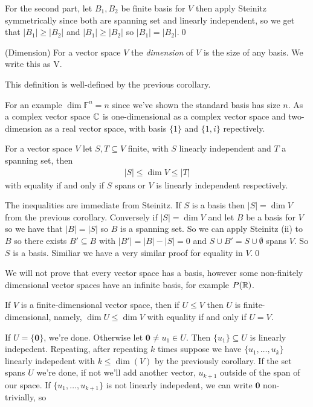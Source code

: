 \documentclass{article}
\newcommand{\F}{\mathbb{F}}
\begin{document}
For the second part, let $ B_1,B_2 $ be finite basis for $ V $ then apply Steinitz symmetrically since both are spanning set and linearly independent, so we get that $ |B_1|\ge |B_2| $ and $ |B_1|\ge |B_2| $ so $ |B_1|=|B_2| $.\qed
\begin{definition}
	(Dimension) For a vector space $ V $ the \textit{dimension} of $ V $ is the size of any basis. We write this as \dim V.
\end{definition}
This definition is well-defined by the previous corollary.\par
For an example $ \dim \F^n=n $ since we've shown the standard basis has size $ n $. As a complex vector space $ \mathbb{C} $ is one-dimensional as a complex vector space and two-dimension as a real vector space, with basis $ \{1\} $ and $ \{1,i\} $ repectively.
\begin{corollary}
  For a vector space $ V $ let $ S,T\subseteq V $ finite, with $ S $ linearly independent and $ T $ a spanning set, then
  \begin{align*}
	  |S|\le \dim V\le |T|
	  \end{align*}
	  with equality if and only if $ S $ spans or $ V $ is linearly independent respectively.
\end{corollary}
\pf The inequalities are immediate from Steinitz. If $ S $ is a basis then $ |S|=\dim V $ from the previous corollary. Conversely if $ |S|=\dim V $ and let $ B $ be a basis for $ V $ so we have that $ |B|=|S| $ so $ B $ is a spanning set. So we can apply Steinitz (ii) to $ B $ so there exists $ B'\subseteq B $ with $ |B'|=|B|-|S|=0 $ and $ S\cup B'=S\cup \emptyset $ spans $ V $. So $ S $ is a basis. Similiar we have a very similar proof for equality in $ V $.\qed\par We will not prove that every vector space has a basis, however some non-finitely dimensional vector spaces have an infinite basis, for example $ P(\mathbb{R}) $.
\begin{proposition}
  If $ V $ is a finite-dimensional vector space, then if $ U\le V $ then $ U $ is finite-dimensional, namely, $ \dim U \le \dim V $ with equality if and only if $ U=V $.
\end{proposition}
\pf If $ U=\{\mathbf 0\} $, we're done. Otherwise let $ \mathbf 0\ne u_1\in U $. Then $ \{u_1\}\subseteq U $ is linearly indepedent. Repeating, after repeating $ k $ times suppose we have $ \{u_1,\dots, u_k\} $ linearly indepedent with $ k\le \dim(V) $ by the previously corollary. If the set spans $ U $ we're done, if not we'll add another vector, $ u_{k+1} $ outside of the span of our space. If $ \{u_1,\dots, u_{k+1}\} $ is not linearly indepedent, we can write $ \mathbf 0 $ non-trivially, so
\end{document}
